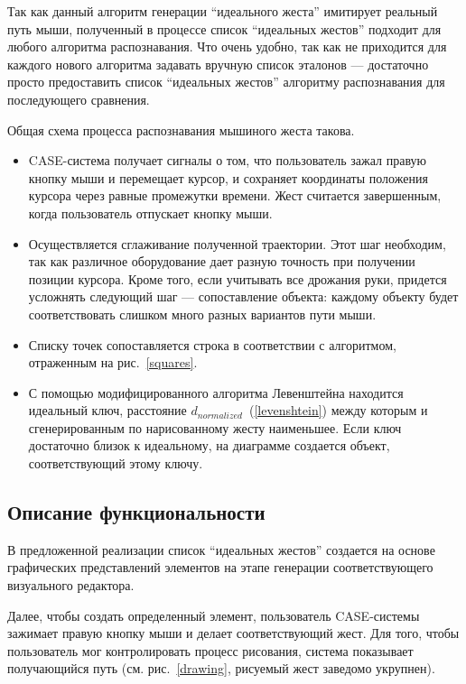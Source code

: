\documentclass[a5paper]{article}
\begin{document}
Так как данный алгоритм генерации ``идеального жеста'' имитирует реальный путь мыши, полученный в процессе список ``идеальных жестов'' подходит для любого алгоритма распознавания. Что очень удобно, так как не приходится для каждого нового алгоритма задавать вручную список эталонов --- достаточно просто предоставить список ``идеальных жестов'' алгоритму распознавания для последующего сравнения.

Общая схема процесса распознавания мышиного жеста такова.

\begin{itemize}
  \item CASE-система получает сигналы о том, что пользователь зажал правую кнопку мыши и перемещает курсор, и сохраняет координаты положения курсора через равные промежутки времени. Жест считается завершенным, когда пользователь отпускает кнопку мыши.
  \item Осуществляется сглаживание полученной траектории. Этот шаг необходим, так как различное оборудование дает разную точность при получении позиции курсора. Кроме того, если учитывать все дрожания руки, придется усложнять следующий шаг --- сопоставление объекта: каждому объекту будет соответствовать слишком много разных вариантов пути мыши.
  \item Списку точек сопоставляется строка в соответствии с алгоритмом, отраженным на рис.~\ref{squares}.
  \item С помощью модифицированного алгоритма Левенштейна находится идеальный ключ, расстояние $d_{normalized}$~(\ref{levenshtein}) между которым и сгенерированным по нарисованному жесту наименьшее. Если ключ достаточно близок к идеальному, на диаграмме создается объект, соответствующий этому ключу.
\end{itemize}

\subsection{Описание функциональности}
В предложенной реализации список ``идеальных жестов'' создается на основе графических представлений элементов на этапе генерации соответствующего визуального редактора.

Далее, чтобы создать определенный элемент, пользователь CASE-системы зажимает правую кнопку мыши и делает соответствующий жест. Для того, чтобы пользователь мог контролировать процесс рисования, система показывает получающийся путь (см. рис.~\ref{drawing}, рисуемый жест заведомо укрупнен).
\end{document}
